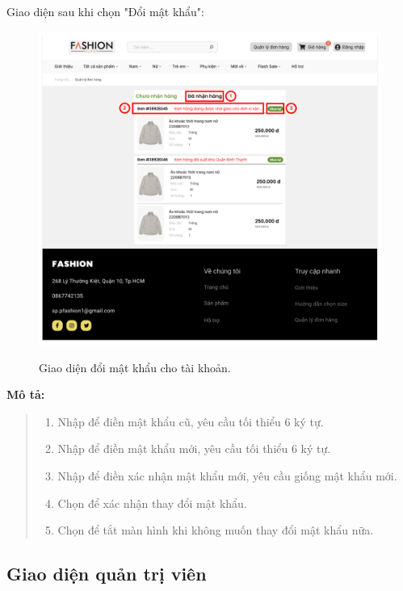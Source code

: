     Giao diện sau khi chọn "Đổi mật khẩu":
    \begin{figure}[!htp]
        \centering
        \includegraphics[width=5in]{img/UI/customer/customer_order.png}
        \label{16}
        \newline
        \caption{Giao diện đổi mật khẩu cho tài khoản.}
    \end{figure}
    \textbf{Mô tả:}  
    \begin{quote}
        \begin{enumerate}
            \item Nhập để điền mật khẩu cũ, yêu cầu tối thiểu 6 ký tự.
            \item Nhập để điền mật khẩu mới, yêu cầu tối thiểu 6 ký tự.
            \item Nhập để điền xác nhận mật khẩu mới, yêu cầu giống mật khẩu mới.
            \item Chọn để xác nhận thay đổi mật khẩu.
            \item Chọn để tắt màn hình khi không muốn thay đổi mật khẩu nữa.
        \end{enumerate}
    \end{quote}   
    
\subsection{Giao diện quản trị viên}
